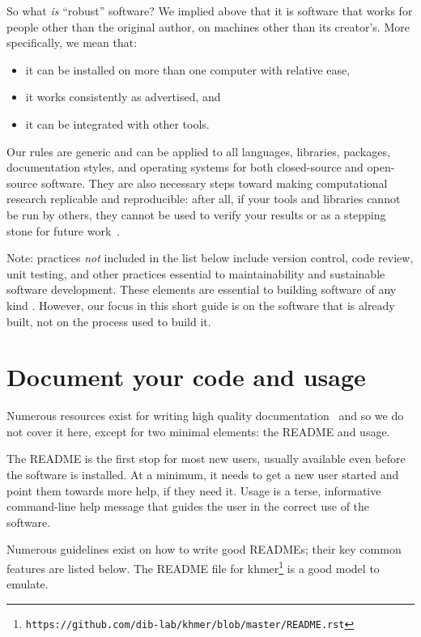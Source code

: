 \documentclass[10pt,letterpaper]{article}
\newcommand{\withurl}[2]{{#1}\footnote{\texttt{#2}}}
\begin{document}
So what \emph{is} ``robust'' software?
We implied above that it is software that works for people other than the original author,
on machines other than its creator's.
More specifically, we mean that:

\begin{itemize}
\item
  it can be installed on more than one computer with relative ease,
\item
  it works consistently as advertised, and
\item
  it can be integrated with other tools.
\end{itemize}

Our rules are generic and can be applied to all languages, libraries, packages,
documentation styles, and operating systems for both closed-source and open-source software.  
They are also necessary steps toward making computational research replicable and reproducible:
after all,
if your tools and libraries cannot be run by others,
they cannot be used to verify your results or as a stepping stone for future work~\cite{brown2013}. 

Note: practices \emph{not} included in the list below include version control,
code review, unit testing, and other practices essential to maintainability and
sustainable software development.
These elements are essential to building software of any kind
\cite{wilson2014,wilson2016}.
However,
our focus in this short guide is on the software that is already built,
not on the process used to build it.


\section{Document your code and usage}

Numerous resources exist for writing high quality
documentation~\cite{karimzadeh2016} and so we do not cover it here, except for
two minimal elements: the README and usage.

The README is the first stop for most new users, usually available even before
the software is installed.
At a minimum, it needs to get a new user started and point them towards more
help, if they need it. Usage is a terse, informative command-line help message that
guides the user in the correct use of the software.

Numerous guidelines exist on how to write good
READMEs\cite{Johnson1997,gnustandards};
their key common features are listed below. 
The README file for \withurl{khmer}{https://github.com/dib-lab/khmer/blob/master/README.rst}
is a good model to emulate.
\end{document}
